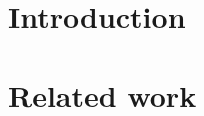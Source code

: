 \begin{abstract}
\end{abstract}

\section{Introduction}
\label{sec:intro}



\section{Related work}
\label{sec:related}



